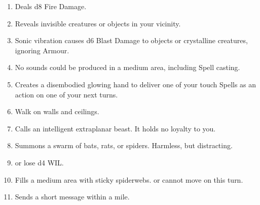 \documentclass[itdr]{subfiles}
\begin{document}
\begin{enumerate}
	\item {} Deals d8 Fire Damage.
	\item {} Reveals invisible creatures or objects in your vicinity.
	\item {} Sonic vibration causes d6 Blast Damage to objects or crystalline creatures, ignoring Armour.
	\item {} No sounds could be produced in a medium area, including Spell casting.
	\item {} Creates a disembodied glowing hand to deliver one of your touch Spells as an action on one of your next turns.
	\item {} Walk on walls and ceilings.
	\item {} Calls an intelligent extraplanar beast. It holds no loyalty to you.
	\item {} Summons a swarm of bats, rats, or spiders. Harmless, but distracting.
	\item {}  or lose d4 WIL.
	\item {} Fills a medium area with sticky spiderwebs.  or cannot move on this turn.
	\item {} Sends a short message within a mile.
\end{enumerate}

\vfill
\break
\end{document}
